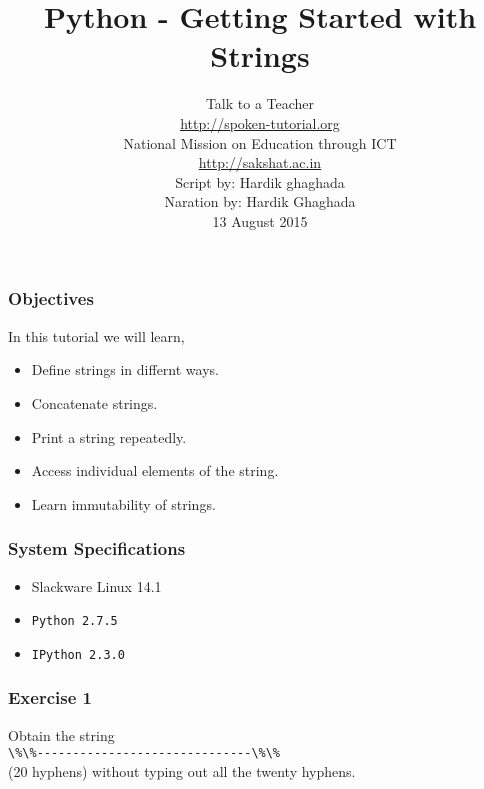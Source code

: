 \documentclass[17pt,compress]{beamer}
\author[FOSSEE]{}
\institute[IIT Bombay]{}
\date[]{}
\begin{document}
\sffamily \bfseries
\title
[Getting Started with Strings]
{Python - Getting Started with Strings}
\author
[FOSSEE, IIT - Bombay]
{\small Talk to a Teacher\\{\color{blue}\url{http://spoken-tutorial.org}}\\National Mission on Education
 through ICT\\{\color{blue}\url{http://sakshat.ac.in}} \\[0.5cm]{\tiny Script by: Hardik ghaghada \\ Naration by: Hardik Ghaghada \\ 13 August 2015}}

\begin{frame}
   \titlepage
\end{frame}
\begin{frame}
\frametitle{Objectives}
\label{sec-2}

  In this tutorial we will learn, \pause

\begin{itemize}
\item Define strings in differnt ways.\pause
\item Concatenate strings.\pause
\item Print a string repeatedly.\pause
\item Access individual elements of the string.\pause
\item Learn immutability of strings.
\end{itemize}
\end{frame}
\begin{frame}
\frametitle{System Specifications}\pause
\begin{itemize}
\item Slackware Linux 14.1\pause
\item \texttt{Python 2.7.5} \pause
\item \texttt{IPython 2.3.0}
\end{itemize}
\end{frame}
\begin{frame}
\frametitle{Exercise 1}
\label{sec-3}

  Obtain the string \\ \verb~\%\%------------------------------\%\%~ \\(20 hyphens) without
  typing out all the twenty hyphens.
\end{frame}
\end{document}
